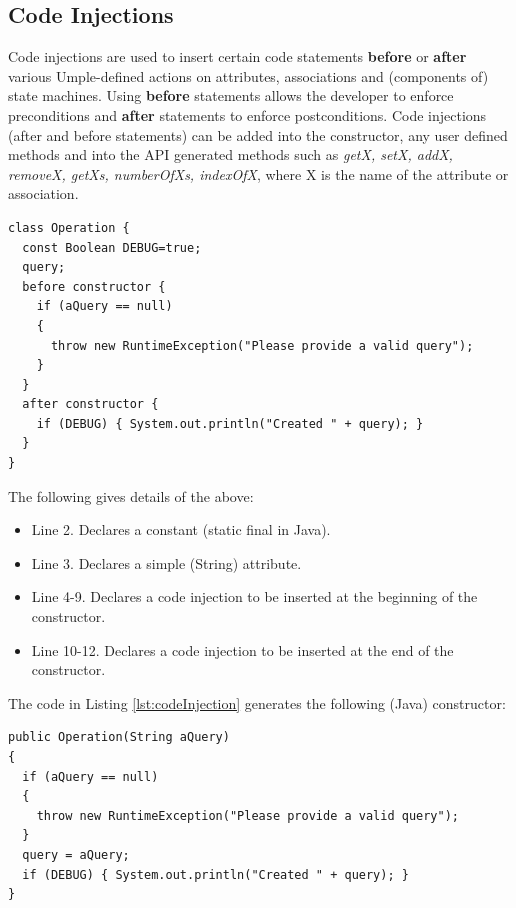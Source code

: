 
\subsection{Code Injections}
Code injections are used to insert certain code statements \textbf{before} or \textbf{after} various Umple-defined actions on attributes, associations and (components of) state machines. Using \textbf{before} statements allows the developer to enforce preconditions and \textbf{after} statements to enforce postconditions. Code injections (after and before statements) can be added into the constructor, any user defined methods and into the API generated methods such as \textit{getX, setX, addX, removeX, getXs, numberOfXs, indexOfX}, where X is the name of the attribute or association.

\begin{lstlisting}[style=umpleOut,label={lst:codeInjection},caption=A code injection into the constructor]
class Operation {  
  const Boolean DEBUG=true;  
  query;  
  before constructor {  
    if (aQuery == null)  
    {  
      throw new RuntimeException("Please provide a valid query");  
    }  
  }  
  after constructor {  
    if (DEBUG) { System.out.println("Created " + query); }  
  }  
}  
\end{lstlisting}

The following gives details of the above:
\begin{itemize}
\item Line 2. Declares a constant (static final in Java). 
\item Line 3. Declares a simple (String) attribute.   	 
\item Line 4-9. Declares a code injection to be inserted at the beginning of the constructor.  
\item Line 10-12. Declares a code injection to be inserted at the end of the constructor.      
\end{itemize}

The code in Listing \ref{lst:codeInjection} generates the following (Java) constructor:

\begin{lstlisting}[style=java, caption=Generated constructor after code injection]
public Operation(String aQuery)
{
  if (aQuery == null)  
  {  
    throw new RuntimeException("Please provide a valid query");  
  }
  query = aQuery;
  if (DEBUG) { System.out.println("Created " + query); }
} 
\end{lstlisting}
